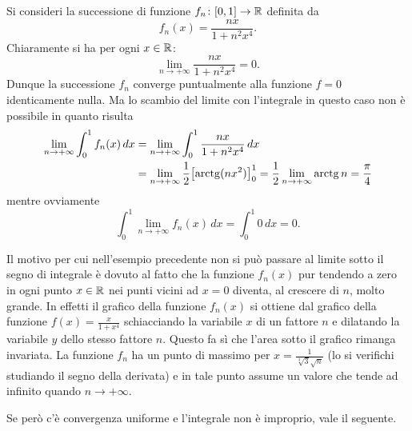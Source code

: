 \begin{example}
Si consideri la successione di funzione $f_n\colon[0,1]\to{\mathbb R}$ definita da 
\[
 f_n(x) = \frac{nx}{1+n^2x^4}.  
\]
Chiaramente si ha per ogni $x\in {\mathbb R}$:
\[
  \lim_{n\to+\infty} \frac{nx}{1+n^2x^4} = 0.
\]
Dunque la successione $f_n$ converge puntualmente alla funzione $f=0$ identicamente nulla.
Ma lo scambio del limite con l'integrale in questo caso 
non è possibile in quanto risulta 
\begin{align*}
\lim_{n\to +\infty} \int_0^1 f_n(x)\, dx 
&= \lim_{n\to +\infty} \int_0^1 \frac{nx}{1+n^2x^4}\, dx \\
&=\lim_{n\to +\infty} \frac 1 2 {\left[ \operatorname{arctg}(nx^2) \right]}_0^1 
 = \frac 1 2 \lim_{n\to +\infty} \operatorname{arctg} n = \frac \pi 4 
\end{align*}
mentre ovviamente 
\[
 \int_0^1 \lim_{n\to +\infty} f_n(x)\, dx = \int_0^1 0\, dx = 0.
\]
\end{example}

Il motivo per cui nell'esempio precedente non si può passare 
al limite sotto il segno di integrale è dovuto al fatto che la funzione 
$f_n(x)$ pur tendendo a zero in ogni punto $x\in {\mathbb R}$ nei punti vicini 
ad $x=0$ diventa, al crescere di $n$, molto grande.
In effetti il grafico della funzione $f_n(x)$ si ottiene dal grafico 
della funzione $f(x) = \frac{x}{1+x^4}$ schiacciando la variabile $x$ 
di un fattore $n$ e dilatando la variabile $y$ dello stesso fattore $n$.
Questo fa sì che l'area sotto il grafico rimanga invariata.
La funzione $f_n$ ha un punto di massimo per $x=\frac{1}{\sqrt[4]3 \sqrt n}$
(lo si verifichi studiando il segno della derivata) e in tale 
punto assume un valore che tende ad infinito quando $n\to +\infty$.

Se però c'è convergenza uniforme e l'integrale non è improprio, 
vale il seguente.

